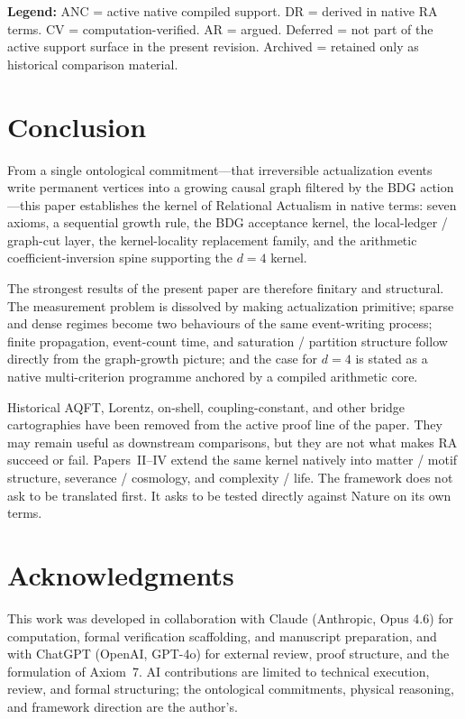 \documentclass[11pt]{article}
\begin{document}
\textbf{Legend:} ANC = active native compiled support. DR = derived in native RA terms. CV = computation-verified. AR = argued. Deferred = not part of the active support surface in the present revision. Archived = retained only as historical comparison material.

\section{Conclusion}
\label{sec:conclusion}

From a single ontological commitment---that irreversible actualization events write permanent vertices into a growing causal graph filtered by the BDG action---this paper establishes the kernel of Relational Actualism in native terms: seven axioms, a sequential growth rule, the BDG acceptance kernel, the local-ledger / graph-cut layer, the kernel-locality replacement family, and the arithmetic coefficient-inversion spine supporting the $d=4$ kernel.

The strongest results of the present paper are therefore finitary and structural. The measurement problem is dissolved by making actualization primitive; sparse and dense regimes become two behaviours of the same event-writing process; finite propagation, event-count time, and saturation / partition structure follow directly from the graph-growth picture; and the case for $d=4$ is stated as a native multi-criterion programme anchored by a compiled arithmetic core.

Historical AQFT, Lorentz, on-shell, coupling-constant, and other bridge cartographies have been removed from the active proof line of the paper. They may remain useful as downstream comparisons, but they are not what makes RA succeed or fail. Papers~II--IV extend the same kernel natively into matter / motif structure, severance / cosmology, and complexity / life. The framework does not ask to be translated first. It asks to be tested directly against Nature on its own terms.

\section*{Acknowledgments}

This work was developed in collaboration with Claude (Anthropic, Opus 4.6) for computation, formal verification scaffolding, and manuscript preparation, and with ChatGPT (OpenAI, GPT-4o) for external review, proof structure, and the formulation of Axiom~7. AI contributions are limited to technical execution, review, and formal structuring; the ontological commitments, physical reasoning, and framework direction are the author's.
\end{document}
